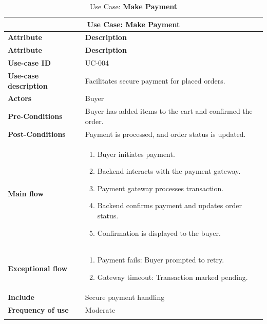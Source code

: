 \documentclass[12pt]{report}
\begin{document}
\begin{appendices}
	\begin{longtable}[H]{|l|p{9cm}||}
		\hline
		\multicolumn{2}{|c||}{\textbf{Use Case: Make Payment}}                                     \\
		\hline
		\textbf{Attribute}            & \textbf{Description}                                       \\
		\hline
		\endfirsthead
		\hline
		\textbf{Attribute}            & \textbf{Description}                                       \\
		\hline
		\endhead
		\textbf{Use-case ID}          & UC-004                                                     \\
		\hline
		\textbf{Use-case description} & Facilitates secure payment for placed orders.              \\
		\hline
		\textbf{Actors}               & Buyer                                                      \\
		\hline
		\textbf{Pre-Conditions}       & Buyer has added items to the cart and confirmed the order. \\
		\hline
		\textbf{Post-Conditions}      & Payment is processed, and order status is updated.         \\
		\hline
		\textbf{Main flow}            & \begin{enumerate}
			                                \item Buyer initiates payment.
			                                \item Backend interacts with the payment gateway.
			                                \item Payment gateway processes transaction.
			                                \item Backend confirms payment and updates order status.
			                                \item Confirmation is displayed to the buyer.
		                                \end{enumerate}    \\
		\hline
		\textbf{Exceptional flow}     & \begin{enumerate}
			                                \item Payment fails: Buyer prompted to retry.
			                                \item Gateway timeout: Transaction marked pending.
		                                \end{enumerate}          \\
		\hline
		\textbf{Include}              & Secure payment handling                                    \\
		\hline
		\textbf{Frequency of use}     & Moderate                                                   \\
		\hline
		\hline
		\caption{Use Case: \textbf{Make Payment}}\label{tab:tableMakePayment}
	\end{longtable}


\end{appendices}
\end{document}

